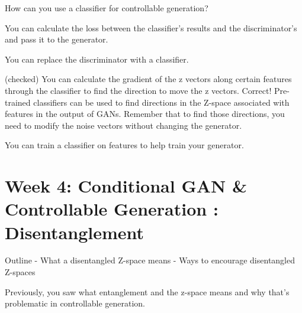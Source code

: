 \documentclass[11pt, onecolumn]{article}
\begin{document}
How can you use a classifier for controllable generation?

You can calculate the loss between the classifier’s results and the discriminator’s and pass it to the generator.

You can replace the discriminator with a classifier.

(checked) You can calculate the gradient of the z vectors along certain features through the classifier to find the direction to move the z vectors.
Correct! Pre-trained classifiers can be used to find directions in the Z-space associated with features in the output of GANs. Remember that to find those directions, you need to modify the noise vectors without changing the generator.

You can train a classifier on features to help train your generator.


\section{Week 4: Conditional GAN \& Controllable Generation : Disentanglement}

Outline
- What a disentangled Z-space means
- Ways to encourage disentangled Z-spaces


Previously, you saw what entanglement and the z-space means and why that's problematic in controllable generation.
\end{document}
